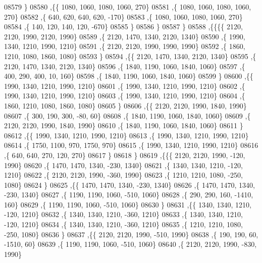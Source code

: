 \begin{DoxyCode}
08579     \}
08580    ,\{\{  1080,  1060,  1080,  1060,   270\}
08581     ,\{  1080,  1060,  1080,  1060,   270\}
08582     ,\{   640,   620,   640,   620,  -170\}
08583     ,\{  1080,  1060,  1080,  1060,   270\}
08584     ,\{   140,   120,   140,   120,  -670\}
08585     \}
08586    \}
08587   \}
08588  ,\{\{\{\{  2120,  2120,  1990,  2120,  1990\}
08589     ,\{  2120,  1470,  1340,  2120,  1340\}
08590     ,\{  1990,  1340,  1210,  1990,  1210\}
08591     ,\{  2120,  2120,  1990,  1990,  1990\}
08592     ,\{  1860,  1210,  1080,  1860,  1080\}
08593     \}
08594    ,\{\{  2120,  1470,  1340,  2120,  1340\}
08595     ,\{  2120,  1470,  1340,  2120,  1340\}
08596     ,\{  1840,  1190,  1060,  1840,  1060\}
08597     ,\{   400,   290,   400,    10,   160\}
08598     ,\{  1840,  1190,  1060,  1840,  1060\}
08599     \}
08600    ,\{\{  1990,  1340,  1210,  1990,  1210\}
08601     ,\{  1990,  1340,  1210,  1990,  1210\}
08602     ,\{  1990,  1340,  1210,  1990,  1210\}
08603     ,\{  1990,  1340,  1210,  1990,  1210\}
08604     ,\{  1860,  1210,  1080,  1860,  1080\}
08605     \}
08606    ,\{\{  2120,  2120,  1990,  1840,  1990\}
08607     ,\{   300,   190,   300,   -80,    60\}
08608     ,\{  1840,  1190,  1060,  1840,  1060\}
08609     ,\{  2120,  2120,  1990,  1840,  1990\}
08610     ,\{  1840,  1190,  1060,  1840,  1060\}
08611     \}
08612    ,\{\{  1990,  1340,  1210,  1990,  1210\}
08613     ,\{  1990,  1340,  1210,  1990,  1210\}
08614     ,\{  1750,  1100,   970,  1750,   970\}
08615     ,\{  1990,  1340,  1210,  1990,  1210\}
08616     ,\{   640,   640,   270,   120,   270\}
08617     \}
08618    \}
08619   ,\{\{\{  2120,  2120,  1990,  -120,  1990\}
08620     ,\{  1470,  1470,  1340,  -230,  1340\}
08621     ,\{  1340,  1340,  1210,  -120,  1210\}
08622     ,\{  2120,  2120,  1990,  -360,  1990\}
08623     ,\{  1210,  1210,  1080,  -250,  1080\}
08624     \}
08625    ,\{\{  1470,  1470,  1340,  -230,  1340\}
08626     ,\{  1470,  1470,  1340,  -230,  1340\}
08627     ,\{  1190,  1190,  1060,  -510,  1060\}
08628     ,\{   290,   290,   160, -1410,   160\}
08629     ,\{  1190,  1190,  1060,  -510,  1060\}
08630     \}
08631    ,\{\{  1340,  1340,  1210,  -120,  1210\}
08632     ,\{  1340,  1340,  1210,  -360,  1210\}
08633     ,\{  1340,  1340,  1210,  -120,  1210\}
08634     ,\{  1340,  1340,  1210,  -360,  1210\}
08635     ,\{  1210,  1210,  1080,  -250,  1080\}
08636     \}
08637    ,\{\{  2120,  2120,  1990,  -510,  1990\}
08638     ,\{   190,   190,    60, -1510,    60\}
08639     ,\{  1190,  1190,  1060,  -510,  1060\}
08640     ,\{  2120,  2120,  1990,  -830,  1990\}

\end{DoxyCode}

